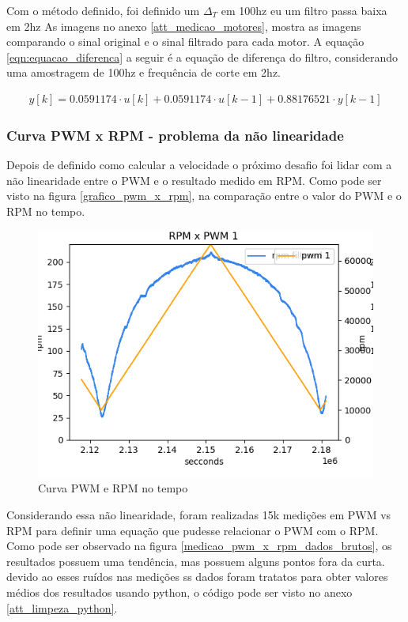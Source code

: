 Com o método definido, foi definido um $\Delta_{T}$ em 100hz eu um filtro passa baixa em 2hz
As imagens no anexo \autoref{att_medicao_motores}, mostra as imagens comparando o sinal original e o sinal filtrado para cada motor.
A equação \autoref{eqn:equacao_diferenca} a seguir é a equação de diferença do filtro, considerando uma amostragem de 100hz e frequência de corte em 2hz.

\begin{equation}
    \begin{split}
        y[k] = 0.0591174 \cdot u \left[ k \right] +  0.0591174 \cdot u[k - 1] + 0.88176521 \cdot y[k - 1]
    \end{split}
    \label{eqn:equacao_diferenca}
\end{equation}

\subsubsection{Curva PWM x RPM - problema da não linearidade}

Depois de definido como calcular a velocidade o próximo desafio foi lidar com a não linearidade entre o PWM e o resultado medido em RPM.
Como pode ser visto na figura \autoref{grafico_pwm_x_rpm}, na comparação entre o valor do PWM e o RPM no tempo.

\begin{figure}[htb]
	\centering
	\includegraphics{figures/pwm_x_rpm}
	\caption{Curva PWM e RPM no tempo}
	\label{fig:grafico_pwm_x_rpm}
\end{figure}

Considerando essa não linearidade, foram realizadas 15k medições em PWM vs RPM para definir uma equação que pudesse relacionar o PWM com o RPM.
Como pode ser observado na figura  \autoref{medicao_pwm_x_rpm_dados_brutos}, os resultados possuem uma tendência, mas possuem alguns pontos fora da curta.
devido ao esses ruídos nas medições ss dados foram tratatos para obter valores médios dos resultados usando python,
o código pode ser visto no anexo \autoref{att_limpeza_python}.

